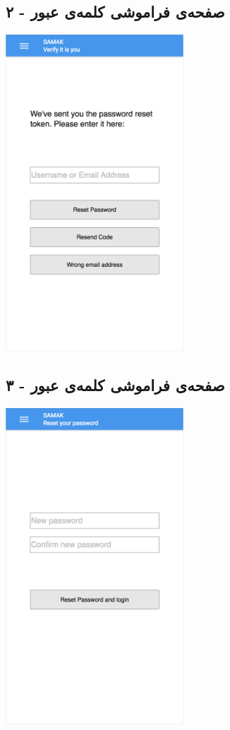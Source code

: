 \subsection{صفحه‌ی فراموشی کلمه‌ی عبور - ۲}
\begin{center}
\includegraphics[width = 0.5\textwidth]{images/5-forgot-password-2.png}
\end{center}







\subsection{صفحه‌ی فراموشی کلمه‌ی عبور - ۳}

\begin{center}
\includegraphics[width = 0.5\textwidth]{images/6-forgot-password-3.png}
\end{center}



